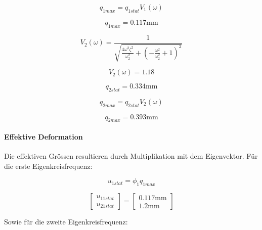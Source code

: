 \documentclass[
  letterpaper,
  DIV=11]{scrreprt}
\let\oldparagraph\paragraph
\renewcommand{\paragraph}[1]{\oldparagraph{#1}\mbox{}}
\begin{document}
\begin{equation}q_{1 max} = q_{1 stat} V_{1}{\left(\omega \right)}\end{equation}

\begin{equation}q_{1 max} = 0.117 \text{mm}\end{equation}

\begin{equation}V_{2}{\left(\omega \right)} = \frac{1}{\sqrt{\frac{4 \omega^{2} \zeta_{}^{2}}{\omega_{2}^{2}} + \left(- \frac{\omega^{2}}{\omega_{2}^{2}} + 1\right)^{2}}}\end{equation}

\begin{equation}V_{2}{\left(\omega \right)} = 1.18\end{equation}

\begin{equation}q_{2 stat} = 0.334 \text{mm}\end{equation}

\begin{equation}q_{2 max} = q_{2 stat} V_{2}{\left(\omega \right)}\end{equation}

\begin{equation}q_{2 max} = 0.393 \text{mm}\end{equation}

\hypertarget{effektive-deformation}{%
\paragraph{Effektive Deformation}\label{effektive-deformation}}

Die effektiven Grössen resultieren durch Multiplikation mit dem
Eigenvektor. Für die erste Eigenkreisfrequenz:

\begin{equation}u_{1 stat} = \phi_{1} q_{1 max}\end{equation}

\begin{equation}\left[\begin{matrix}u_{11stat}\\u_{21stat}\end{matrix}\right] = \left[\begin{matrix}0.117 \text{mm}\\1.2 \text{mm}\end{matrix}\right]\end{equation}

Sowie für die zweite Eigenkreisfrequenz:
\end{document}
